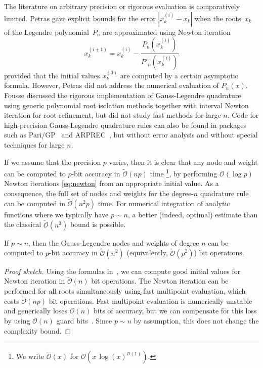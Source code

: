 \documentclass[nohypdvips,review]{siamart0216}
\newcommand{\OO}{\mathcal{O}}
\newcommand{\OOtilde}{\widetilde{\mathcal{O}}}
\begin{document}
The literature on arbitrary precision or rigorous evaluation
is comparatively limited.
Petras \cite{petras1999computation} gave explicit
bounds for the error $|x_k^{(i)} - x_k|$ when
the roots $x_k$ of the Legendre polynomial $P_n$
are approximated using Newton iteration
\begin{equation}
\label{eq:newton}
x^{(i+1)}_k = x^{(i)}_k - \frac{P_n(x^{(i)}_k)}{P'_n(x^{(i)}_k)}
\end{equation}
provided that the initial values $x^{(0)}_k$
are computed by a certain asymptotic formula.
However, Petras did not address the numerical evaluation of $P_n(x)$.
Fousse \cite{fousse2007accurate} discussed the rigorous implementation
of Gauss-Legendre quadrature
using generic polynomial root isolation methods together with
interval Newton iteration
for root refinement,
but did not study fast methods for large $n$.
Code for high-precision Gauss-Legendre quadrature rules can also be found
in packages such as Pari/GP~\cite{PARI2}
and ARPREC~\cite{bailey2002arprec}, but without error analysis
and without special techniques for large $n$.

If we assume that the precision $p$ varies,
then it is clear that any node and weight
can be computed to $p$-bit accuracy in $\OOtilde(n p)$ time%
\footnote{We write $\OOtilde(x)$ for $\OO(x \, \log(x)^{\OO(1)})$.},
by performing $\OO(\log p)$ Newton iterations \cref{eq:newton}
from an appropriate initial value.
As a consequence, the full set of nodes and weights
for the degree-$n$ quadrature rule
can be computed in $\OOtilde(n^2 p)$ time.
For numerical integration of analytic functions
where we typically have $p \sim n$, a better (indeed, optimal) estimate
than the classical $\OOtilde(n^3)$ bound is possible.

\begin{theorem}
\label{thm:complexity}
If $p \sim n$, then the Gauss-Legendre nodes and weights of degree $n$ can be computed to
$p$-bit accuracy in $\OOtilde(n^2)$ (equivalently, $\OOtilde(p^2)$) bit operations.
\end{theorem}

\begin{proof}[Proof sketch]
Using the formulas in~\cite{petras1999computation},
we can compute good initial values for Newton iteration
in $\OOtilde(n)$ bit operations.
The Newton iteration can be performed for all roots
simultaneously using fast multipoint evaluation, which costs
$\OOtilde(n p)$ bit operations.
Fast multipoint evaluation is numerically unstable and
generically loses $\OO(n)$ bits of accuracy, but we can compensate for
this loss by using $\OO(n)$ guard bits~\cite{kobel2013fast}.
Since $p \sim n$ by assumption, this does not change the complexity bound.
\end{proof}
\end{document}

